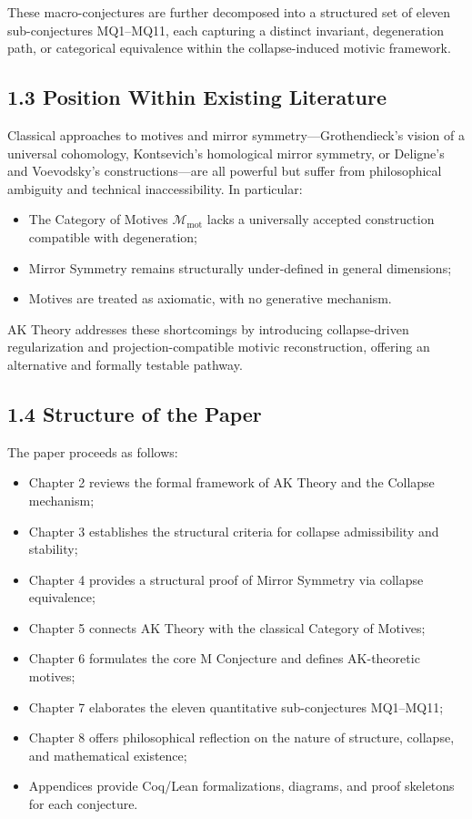 \documentclass[11pt]{article}
\begin{document}
These macro-conjectures are further decomposed into a structured set of eleven sub-conjectures MQ1--MQ11, each capturing a distinct invariant, degeneration path, or categorical equivalence within the collapse-induced motivic framework.

\subsection{1.3 Position Within Existing Literature}

Classical approaches to motives and mirror symmetry—Grothendieck’s vision of a universal cohomology, Kontsevich’s homological mirror symmetry, or Deligne’s and Voevodsky’s constructions—are all powerful but suffer from philosophical ambiguity and technical inaccessibility. In particular:

\begin{itemize}
    \item The Category of Motives $\mathcal{M}_{\mathrm{mot}}$ lacks a universally accepted construction compatible with degeneration;
    \item Mirror Symmetry remains structurally under-defined in general dimensions;
    \item Motives are treated as axiomatic, with no generative mechanism.
\end{itemize}

AK Theory addresses these shortcomings by introducing collapse-driven regularization and projection-compatible motivic reconstruction, offering an alternative and formally testable pathway.

\subsection{1.4 Structure of the Paper}

The paper proceeds as follows:

\begin{itemize}
    \item Chapter 2 reviews the formal framework of AK Theory and the Collapse mechanism;
    \item Chapter 3 establishes the structural criteria for collapse admissibility and stability;
    \item Chapter 4 provides a structural proof of Mirror Symmetry via collapse equivalence;
    \item Chapter 5 connects AK Theory with the classical Category of Motives;
    \item Chapter 6 formulates the core M Conjecture and defines AK-theoretic motives;
    \item Chapter 7 elaborates the eleven quantitative sub-conjectures MQ1--MQ11;
    \item Chapter 8 offers philosophical reflection on the nature of structure, collapse, and mathematical existence;
    \item Appendices provide Coq/Lean formalizations, diagrams, and proof skeletons for each conjecture.
\end{itemize}
\end{document}
